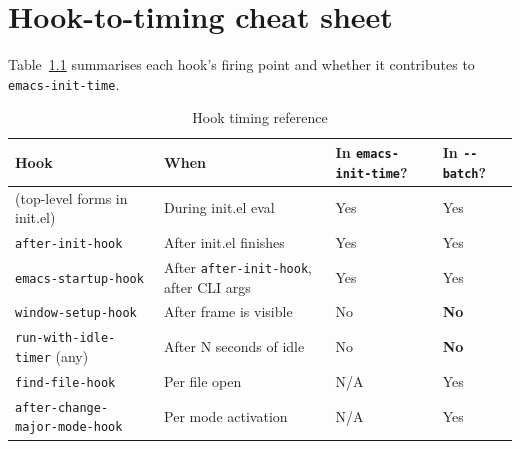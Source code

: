 \chapter{Hook-to-timing cheat sheet}
\label{app:hook-timing}

\noindent
Table~\ref{tab:hook-timing} summarises each hook's firing point and whether it contributes to \texttt{emacs-init-time}.

\begin{table}
\centering
\caption{Hook timing reference}
\label{tab:hook-timing}
\begin{tabularx}{\linewidth}{@{}lXll@{}}
\toprule
Hook & When & In \texttt{emacs-init-time}? & In \texttt{-{}-batch}? \\
\midrule
(top-level forms in init.el) & During init.el eval & Yes & Yes \\
\texttt{after-init-hook} & After init.el finishes & Yes & Yes \\
\texttt{emacs-startup-hook} & After \texttt{after-init-hook}, after CLI args & Yes & Yes \\
\texttt{window-setup-hook} & After frame is visible & No & \textbf{No} \\
\texttt{run-with-idle-timer} (any) & After N seconds of idle & No & \textbf{No} \\
\texttt{find-file-hook} & Per file open & N/A & Yes \\
\texttt{after-change-major-mode-hook} & Per mode activation & N/A & Yes \\
\bottomrule
\end{tabularx}
\end{table}
